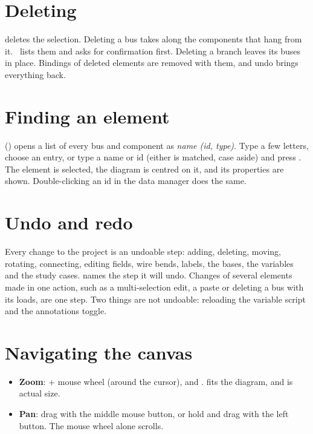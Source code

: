 \section{Deleting}\label{sec:deleting}

 deletes the selection. Deleting a bus takes along the components that hang from
it. \app\ lists them and asks for confirmation first. Deleting a branch leaves its buses
in place. Bindings of deleted elements are removed with them, and undo brings everything
back.

\section{Finding an element}\label{sec:find}

 () opens a list of every bus and component
as \emph{name (id, type)}. Type a few letters, choose an entry, or type a name or id
(either is matched, case aside) and press . The element is selected, the
diagram is centred on it, and its properties are shown. Double-clicking an id in the data
manager does the same.

\section{Undo and redo}

Every change to the project is an undoable step: adding, deleting, moving, rotating,
connecting, editing fields, wire bends, labels, the bases, the variables and the study
cases.  names the step it will undo. Changes of several elements made in
one action, such as a multi-selection edit, a paste or deleting a bus with its loads, are
one step. Two things are not undoable: reloading the variable script and the annotations
toggle.

\section{Navigating the canvas}

\begin{itemize}
  \item \textbf{Zoom}: \keys{\ctrl} + mouse wheel (around the cursor), \keys{\ctrl + +} and
    \keys{\ctrl + -}.  fits the diagram, and  is actual
    size.
  \item \textbf{Pan}: drag with the middle mouse button, or hold  and drag
    with the left button. The mouse wheel alone scrolls.
\end{itemize}

